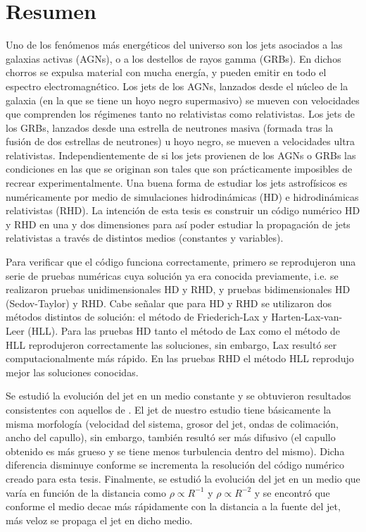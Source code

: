 \documentclass[12pt,a4paper]{book}
\begin{document}
\chapter*{Resumen} %
Uno de los fenómenos más energéticos del universo son los jets asociados a las galaxias activas (AGNs), o a los destellos de rayos gamma (GRBs). En dichos chorros se expulsa material con 
mucha energía, y pueden emitir en todo el espectro electromagnético. Los jets de los AGNs, lanzados desde el núcleo de la galaxia (en la que se tiene un hoyo negro supermasivo) se mueven con 
velocidades que comprenden los régimenes tanto no relativistas como relativistas. Los jets de los GRBs, lanzados desde una estrella de neutrones masiva (formada tras la fusión de dos estrellas de neutrones) u hoyo negro, 
se mueven a velocidades ultra relativistas. Independientemente de si los jets provienen de los AGNs o GRBs las condiciones en las que se originan son tales que son prácticamente imposibles de recrear experimentalmente.
Una buena forma de estudiar los jets astrofísicos es numéricamente por medio de simulaciones hidrodinámicas (HD) e hidrodinámicas relativistas (RHD). La intención de esta tesis es construir un 
código numérico HD y RHD en una y dos dimensiones para así poder estudiar la propagación de jets relativistas a través de distintos medios (constantes y variables).

Para verificar que el código funciona correctamente, primero se reprodujeron una serie de pruebas numéricas cuya solución ya era conocida previamente, i.e. se realizaron pruebas unidimensionales 
HD y RHD, y pruebas bidimensionales HD (Sedov-Taylor) y RHD. Cabe señalar que para HD y RHD se utilizaron dos métodos distintos de solución: el método de Friederich-Lax y 
Harten-Lax-van-Leer (HLL). Para las pruebas HD tanto el método de Lax como el método de HLL reprodujeron correctamente las soluciones, sin embargo, Lax resultó ser computacionalmente más rápido. En las pruebas RHD el 
método HLL reprodujo mejor las soluciones conocidas.

Se estudió la evolución del jet en un medio constante y se obtuvieron resultados consistentes con aquellos de \citet{MB-HLLC-I}. El jet de nuestro estudio tiene básicamente la misma morfología (velocidad del sistema, 
grosor del jet, ondas de colimación, ancho del capullo), sin embargo, también resultó ser más difusivo (el capullo obtenido es más grueso y se tiene menos turbulencia dentro del mismo). Dicha diferencia disminuye conforme 
se incrementa la resolución del código numérico creado para esta tesis. Finalmente, se estudió la evolución del jet en un medio que varía en función de la distancia como $\rho \propto R^{-1}$ y $\rho \propto R^{-2}$ y 
se encontró que conforme el medio decae más rápidamente con la distancia a la fuente del jet, más veloz se propaga el jet en dicho medio.
\end{document}
